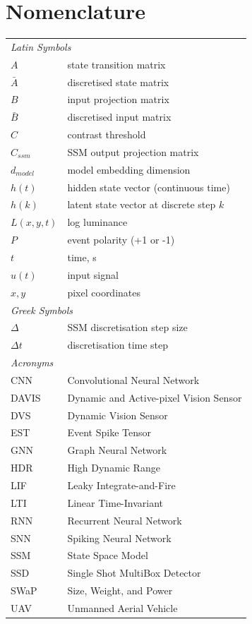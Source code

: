 \documentclass[11pt, a4paper]{report}
\begin{document}
\chapter*{Nomenclature}
\begin{tabular}{ll}
\multicolumn{2}{l}{\textit{Latin Symbols}} \\[4pt]
$A$ & state transition matrix \\
$\bar{A}$ & discretised state matrix \\
$B$ & input projection matrix \\
$\bar{B}$ & discretised input matrix \\
$C$ & contrast threshold \\
$C_{ssm}$ & SSM output projection matrix \\
$d_{model}$ & model embedding dimension \\
$h(t)$ & hidden state vector (continuous time) \\
$h(k)$ & latent state vector at discrete step $k$ \\
$L(x,y,t)$ & log luminance \\
$P$ & event polarity (+1 or -1) \\
$t$ & time, s \\
$u(t)$ & input signal \\
$x, y$ & pixel coordinates \\[8pt]
\multicolumn{2}{l}{\textit{Greek Symbols}} \\[4pt]
$\Delta$ & SSM discretisation step size \\
$\Delta t$ & discretisation time step \\[8pt]
\multicolumn{2}{l}{\textit{Acronyms}} \\[4pt]
CNN & Convolutional Neural Network \\
DAVIS & Dynamic and Active-pixel Vision Sensor \\
DVS & Dynamic Vision Sensor \\
EST & Event Spike Tensor \\
GNN & Graph Neural Network \\
HDR & High Dynamic Range \\
LIF & Leaky Integrate-and-Fire \\
LTI & Linear Time-Invariant \\
RNN & Recurrent Neural Network \\
SNN & Spiking Neural Network \\
SSM & State Space Model \\
SSD & Single Shot MultiBox Detector \\
SWaP & Size, Weight, and Power \\
UAV & Unmanned Aerial Vehicle \\
\end{tabular}
\end{document}
